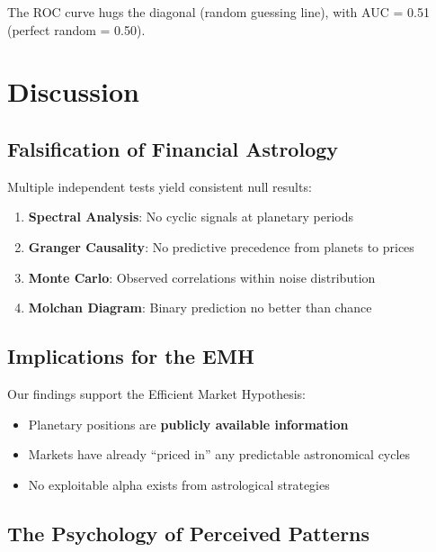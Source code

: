 \documentclass[
  11pt,
  a4paper,
  oneside,
  openany]{article}
\providecommand{\tightlist}{%
  \setlength{\itemsep}{0pt}\setlength{\parskip}{0pt}}\usepackage{longtable,booktabs,array}
\begin{document}
The ROC curve hugs the diagonal (random guessing line), with AUC = 0.51
(perfect random = 0.50).

\section{Discussion}\label{discussion}

\subsection{Falsification of Financial
Astrology}\label{falsification-of-financial-astrology}

Multiple independent tests yield consistent null results:

\begin{enumerate}
\def\labelenumi{\arabic{enumi}.}
\tightlist
\item
  \textbf{Spectral Analysis}: No cyclic signals at planetary periods
\item
  \textbf{Granger Causality}: No predictive precedence from planets to
  prices
\item
  \textbf{Monte Carlo}: Observed correlations within noise distribution
\item
  \textbf{Molchan Diagram}: Binary prediction no better than chance
\end{enumerate}

\subsection{Implications for the EMH}\label{implications-for-the-emh}

Our findings support the Efficient Market Hypothesis:

\begin{itemize}
\tightlist
\item
  Planetary positions are \textbf{publicly available information}
\item
  Markets have already ``priced in'' any predictable astronomical cycles
\item
  No exploitable alpha exists from astrological strategies
\end{itemize}

\subsection{The Psychology of Perceived
Patterns}\label{the-psychology-of-perceived-patterns}
\end{document}
